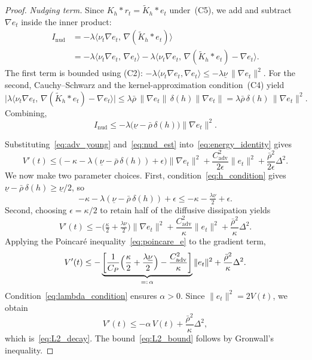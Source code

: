 \begin{proof}
\emph{Nudging term.}
Since $K_h*r_t = \tilde K_h*e_t$ under~(C5), we add and subtract $\nabla e_t$ inside the inner product:
\[
\begin{aligned}
I_{\mathrm{nud}}
&= -\lambda\langle\nu_t\nabla e_t,\,\nabla(\tilde K_h*e_t)\rangle \\
&= -\lambda\langle\nu_t\nabla e_t,\,\nabla e_t\rangle
   -\lambda\langle\nu_t\nabla e_t,\,\nabla(\tilde K_h*e_t)-\nabla e_t\rangle.
\end{aligned}
\]
The first term is bounded using (C2): $-\lambda\langle\nu_t\nabla e_t,\nabla e_t\rangle \le -\lambda\underline\nu\,\|\nabla e_t\|^2$.
For the second, Cauchy--Schwarz and the kernel-approximation condition~(C4) yield
\[
\bigl|\lambda\langle\nu_t\nabla e_t,\,\nabla(\tilde K_h*e_t)-\nabla e_t\rangle\bigr|
\le \lambda\bar\rho\,\|\nabla e_t\|\,\delta(h)\|\nabla e_t\|
= \lambda\bar\rho\,\delta(h)\,\|\nabla e_t\|^2.
\]
Combining,
\begin{equation}\label{eq:nud_est}
I_{\mathrm{nud}}
\le -\lambda\bigl(\underline\nu - \bar\rho\,\delta(h)\bigr)\|\nabla e_t\|^2.
\end{equation}
 
Substituting~\eqref{eq:adv_young} and~\eqref{eq:nud_est} into~\eqref{eq:energy_identity} gives
\[
V'(t)
\le \bigl(-\kappa - \lambda(\underline\nu-\bar\rho\,\delta(h)) + \epsilon\bigr)\|\nabla e_t\|^2
+ \frac{C_{\mathrm{adv}}^2}{2\epsilon}\|e_t\|^2
+ \frac{\bar\rho^2}{2\epsilon}\Delta^2.
\]
We now make two parameter choices.
First, condition~\eqref{eq:h_condition} gives $\underline\nu - \bar\rho\,\delta(h) \ge \underline\nu/2$, so
\[
-\kappa - \lambda(\underline\nu-\bar\rho\,\delta(h)) + \epsilon
\le -\kappa - \tfrac{\lambda\underline\nu}{2} + \epsilon.
\]
Second, choosing $\epsilon = \kappa/2$ to retain half of the diffusive
dissipation yields
\[
V'(t)
\le -\bigl(\tfrac{\kappa}{2}+\tfrac{\lambda\underline\nu}{2}\bigr)\|\nabla e_t\|^2
+ \frac{C_{\mathrm{adv}}^2}{\kappa}\|e_t\|^2
+ \frac{\bar\rho^2}{\kappa}\Delta^2.
\]
Applying the Poincar\'e inequality~\eqref{eq:poincare_e} to the gradient term,
\[
V'(t)
\le -\underbrace{\left[\frac{1}{C_P}\Bigl(\frac{\kappa}{2}+\frac{\lambda\underline\nu}{2}\Bigr)
- \frac{C_{\mathrm{adv}}^2}{\kappa}\right]}_{=:\,\alpha}\|e_t\|^2
+ \frac{\bar\rho^2}{\kappa}\Delta^2.
\]
Condition~\eqref{eq:lambda_condition} ensures $\alpha>0$. Since $\|e_t\|^2 = 2V(t)$, we obtain
\[
V'(t) \le -\alpha\,V(t) + \frac{\bar\rho^2}{\kappa}\Delta^2,
\]
which is~\eqref{eq:L2_decay}. The bound~\eqref{eq:L2_bound} follows by Gronwall's inequality.
\end{proof}



